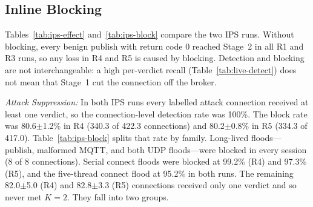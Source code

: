 \documentclass[journal]{IEEEtran}
\begin{document}
\begin{table}[!t]
\centering
\caption{Stage~1 Live Timing per Verdict (Median, ms, Except Collect in s). Inspect = Arrival of the Triggering Packet to Verdict, Inline-Triggered Verdicts Only; Collect = First Packet of the Classified Flow Segment to Verdict, Including Classification Processing}
\label{tab:ids-latency}
\footnotesize
\setlength{\tabcolsep}{3pt}
\end{table}

\subsection{Inline Blocking}
\label{sec:res-e2e}

Tables~\ref{tab:ips-effect} and~\ref{tab:ips-block} compare the two IPS runs. Without blocking, every benign publish with return code 0 reached Stage~2 in all R1 and R3 runs, so any loss in R4 and R5 is caused by blocking. Detection and blocking are not interchangeable: a high per-verdict recall (Table~\ref{tab:live-detect}) does not mean that Stage~1 cut the connection off the broker.

\textit{Attack Suppression:} In both IPS runs every labelled attack connection received at least one verdict, so the connection-level detection rate was 100\%. The block rate was 80.6$\pm$1.2\% in R4 (340.3 of 422.3 connections) and 80.2$\pm$0.8\% in R5 (334.3 of 417.0). Table~\ref{tab:ips-block} splits that rate by family. Long-lived floods---publish, malformed MQTT, and both UDP floods---were blocked in every session (8 of 8 connections). Serial connect floods were blocked at 99.2\% (R4) and 97.3\% (R5), and the five-thread connect flood at 95.2\% in both runs. The remaining 82.0$\pm$5.0 (R4) and 82.8$\pm$3.3 (R5) connections received only one verdict and so never met $K = 2$. They fall into two groups.
\end{document}
